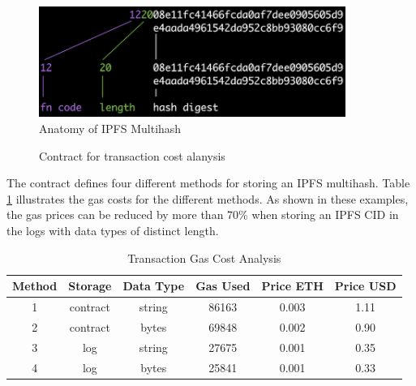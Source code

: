 \begin{figure}[H]
    \centering
    \includegraphics[width=10cm]{images/multihash.jpg}
    \caption{Anatomy of IPFS Multihash \protect\footnotemark}
    \label{img:anatomy-of-ipfs-multihash}
\end{figure}


\newpage
\begin{figure}[H]
    
    \caption{Contract for transaction cost alanysis}
    \label{code:ipfs-storage}
\end{figure}


The contract defines four different methods for storing an IPFS multihash. Table \ref{tab:transaction-gas-cost-analysis} illustrates the gas costs for the different methods. As shown in these examples, the gas prices can be reduced by more than 70\% when storing an IPFS CID in the logs with data types of distinct length.

\begin{table}[ht]
\centering
\begin{tabular}{|c|c|c|c|c|c|}
\hline
\textbf{Method} & \textbf{Storage} & \textbf{Data Type} & \textbf{Gas Used} & \textbf{Price ETH} & \textbf{Price USD} \\ \hline
1               & contract         & string             & 86163             & 0.003              & 1.11               \\ \hline
2               & contract         & bytes              & 69848             & 0.002              & 0.90               \\ \hline
3               & log              & string             & 27675             & 0.001              & 0.35               \\ \hline
4               & log              & bytes              & 25841             & 0.001              & 0.33               \\ \hline
\end{tabular}
\caption{Transaction Gas Cost Analysis}
\label{tab:transaction-gas-cost-analysis}
\end{table}

